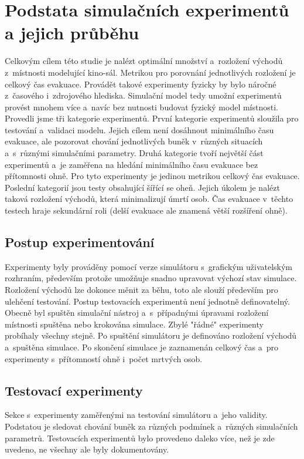 \documentclass[11pt, titlepage, a4paper]{article}
\begin{document}
\section{Podstata simulačních experimentů a jejich průběhu}
\label{experiments}
Celkovým cílem této studie je nalézt optimální množství a~rozložení východů z~místnosti modelující kino-sál. Metrikou pro porovnání jednotlivých rozložení je celkový čas evakuace. Provádět takové experimenty fyzicky by bylo náročné z~časového i~zdrojového hlediska. Simulační model tedy umožní experimentů provést mnohem více a~navíc bez nutnosti budovat fyzický model místnosti. Provedli jsme tři kategorie experimentů. První kategorie experimentů sloužila pro testování a~validaci modelu. Jejich cílem není dosáhnout minimálního času evakuace, ale pozorovat chování jednotlivých buněk v~různých situacích a~s~různými simulačními parametry. Druhá kategorie tvoří největší část experimentů a~je zaměřena na hledání minimálního času evakuace bez přítomnosti ohně. Pro tyto experimenty je jedinou metrikou celkový čas evakuace. Poslední kategorií jsou testy obsahující šířící se oheň. Jejich úkolem je nalézt taková rozložení východů, která minimalizují úmrtí osob. Čas evakuace v~těchto testech hraje sekundární roli (delší evakuace ale znamená větší rozšíření ohně).


    \subsection{Postup experimentování}
    Experimenty byly prováděny pomocí verze simulátoru s~grafickým uživatelským rozhraním, především protože umožňuje snadno upravovat výchozí stav simulace. Rozložení východů lze dokonce měnit za běhu, toto ale slouží především pro ulehčení testování. Postup testovacích experimentů není jednotně definovatelný. Obecně byl spuštěn simulační nástroj a~s~případnými úpravami rozložení místnosti spuštěna nebo krokována simulace. Zbylé "řádné" experimenty probíhaly všechny stejně. Po spuštění simulátoru je definováno rozložení východů a~spuštěna simulace. Po skončení simulace je zaznamenán celkový čas a~pro experimenty s~přítomností ohně i~počet mrtvých osob.

    \subsection{Testovací experimenty}
    \label{test_experiments}
    Sekce s~experimenty zaměřenými na testování simulátoru a~jeho validity. Podstatou je sledovat chování buněk za různých podmínek a~různých simulačních parametrů. Testovacích experimentů bylo provedeno daleko více, než je zde uvedeno, ne všechny ale byly dokumentovány.
\end{document}
